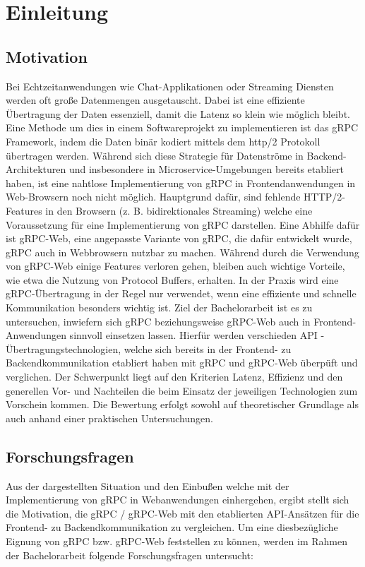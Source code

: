 \chapter{ Einleitung }
\label{chap:info_REMOVE_ME}
\chapterstart

\section{Motivation}
Bei Echtzeitanwendungen wie Chat-Applikationen oder Streaming Diensten werden
oft große Datenmengen ausgetauscht. Dabei ist eine effiziente Übertragung der Daten
essenziell, damit die Latenz so klein wie möglich bleibt. Eine Methode um dies in 
einem Softwareprojekt zu implementieren ist das gRPC Framework, indem die Daten
binär kodiert mittels dem http/2 Protokoll übertragen werden. Während sich diese Strategie für Datenströme in Backend-Architekturen und insbesondere in Microservice-Umgebungen bereits etabliert haben, ist eine nahtlose Implementierung von gRPC in Frontendanwendungen in Web-Browsern noch nicht möglich. Hauptgrund dafür, sind fehlende HTTP/2-Features in den Browsern (z. B. bidirektionales Streaming) welche eine Voraussetzung für eine Implementierung von gRPC darstellen. 
Eine Abhilfe dafür ist gRPC-Web, eine angepasste Variante von gRPC, die dafür entwickelt wurde, gRPC auch in Webbrowsern nutzbar zu machen.
Während durch die Verwendung von gRPC-Web einige  Features verloren gehen, bleiben auch wichtige Vorteile, wie etwa die Nutzung von Protocol Buffers, erhalten.
In der Praxis wird eine gRPC-Übertragung in der Regel nur verwendet, wenn eine effiziente und schnelle Kommunikation
besonders wichtig ist. Ziel der Bachelorarbeit ist es zu untersuchen, inwiefern sich gRPC beziehungsweise gRPC-Web auch in Frontend-Anwendungen sinnvoll einsetzen lassen. Hierfür werden verschieden API - Übertragungstechnologien, welche sich bereits in der Frontend- zu Backendkommunikation etabliert haben mit gRPC und gRPC-Web
überpüft und verglichen. Der Schwerpunkt liegt auf den Kriterien Latenz, Effizienz und den generellen Vor- und Nachteilen die beim Einsatz der jeweiligen Technologien zum Vorschein kommen. Die Bewertung erfolgt sowohl auf theoretischer Grundlage als auch anhand einer praktischen Untersuchungen.

\section{Forschungsfragen}
Aus der dargestellten Situation und den Einbußen welche mit der Implementierung von gRPC in Webanwendungen einhergehen, ergibt stellt sich die Motivation, die gRPC / gRPC-Web mit den etablierten API-Ansätzen für die Frontend- zu Backendkommunikation zu vergleichen. Um eine diesbezügliche Eignung  von gRPC bzw. gRPC-Web feststellen zu können, werden im Rahmen der Bachelorarbeit folgende Forschungsfragen untersucht:

